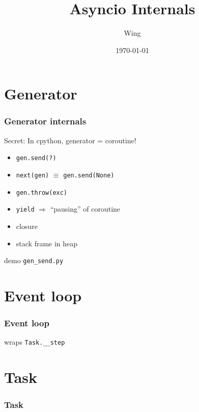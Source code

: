 \documentclass[compress,usenames,dvipsnames]{beamer}
\author{Wing}
\title{Asyncio Internals}
\begin{document}
\date{\today} 

\frame[plain]{\titlepage} %

\section{Generator}
\begin{frame}[plain]
    \frametitle{Generator internals}
    Secret: In cpython, generator = coroutine!
    \begin{itemize}
        \item {\lstinline{gen.send(?)}}
        \item {\lstinline{next(gen)}} $\equiv$ {\lstinline{gen.send(None)}}
        \item {\lstinline{gen.throw(exc)}}
        \item {\lstinline{yield}} $\Rightarrow$ ``pausing'' of coroutine
        \item closure
        \item stack frame in heap

    \end{itemize}
    demo {\lstinline{gen_send.py}}
\end{frame}

\section{Event loop}

\begin{frame}
    \frametitle{Event loop}
    \begin{center}
    \begin{adjustbox}{margin=10pt}
         
    \end{adjustbox}
    \end{center}
    {} wraps \verb|Task.__step|
\end{frame}

\section{Task}

\begin{frame}[plain, t]
    \frametitle{Task}
    \begin{center}
    \begin{adjustbox}{margin=10pt}
             
    \end{adjustbox}
    \end{center}
\end{frame}
\end{document}
